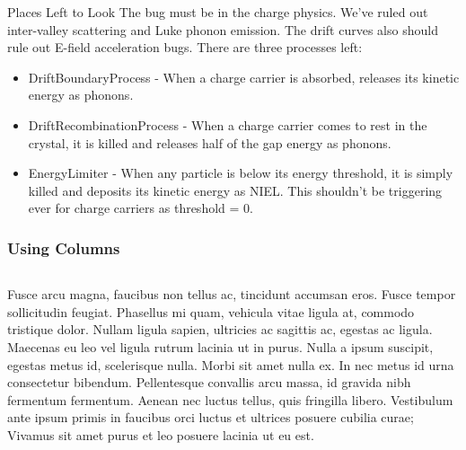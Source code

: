 \documentclass{beamer}
\begin{document}
\begin{frame}{Places Left to Look}
    \vfill
    The bug must be in the charge physics. We've ruled out inter-valley scattering
    and Luke phonon emission. The drift curves also should rule out E-field
    acceleration bugs. There are three processes left:
    \begin{itemize}
        \item DriftBoundaryProcess - When a charge carrier is absorbed, releases
            its kinetic energy as phonons.
        \item DriftRecombinationProcess - When a charge carrier comes to rest
            in the crystal, it is killed and releases half of the gap energy
            as phonons.
        \item EnergyLimiter - When any particle is below its energy threshold,
            it is simply killed and deposits its kinetic energy as NIEL. This
            shouldn't be triggering ever for charge carriers as threshold = 0.
    \end{itemize}
    \vfill
\end{frame}


\begin{frame}
\frametitle{Using Columns}
\begin{columns}
 Fusce arcu magna, faucibus non tellus ac, tincidunt accumsan eros. Fusce tempor sollicitudin feugiat. Phasellus mi quam, vehicula vitae ligula at, commodo tristique dolor. Nullam ligula sapien, ultricies ac sagittis ac, egestas ac ligula. Maecenas eu leo vel ligula rutrum lacinia ut in purus. Nulla a ipsum suscipit, egestas metus id, scelerisque nulla.
Morbi sit amet nulla ex. In nec metus id urna consectetur bibendum. Pellentesque convallis arcu massa, id gravida nibh fermentum fermentum. Aenean nec luctus tellus, quis fringilla libero. Vestibulum ante ipsum primis in faucibus orci luctus et ultrices posuere cubilia curae; Vivamus sit amet purus et leo posuere lacinia ut eu est. 
\end{columns}
\end{frame}
\end{document}
